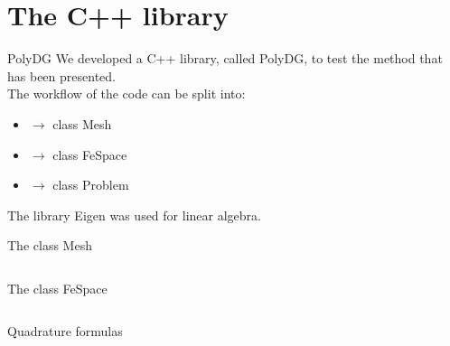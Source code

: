 \documentclass{beamer}
\newcommand{\code}[1]{{\footnotesize\ttfamily #1}}
\begin{document}
\section{The C++ library}
\begin{frame}{PolyDG}
We developed a C++ library, called PolyDG, to test the method that has been 
presented.\\
\vspace{0.5cm}
The workflow of the code can be split into:
\begin{itemize}
	\item {} $ \rightarrow $ class \code{Mesh}
	\item {} $ \rightarrow $ class \code{FeSpace}
	\item {} $ \rightarrow $ class \code{Problem}
\end{itemize}
\vspace{0.5cm}
 The library Eigen was used for linear algebra.
\end{frame}
\begin{frame}{The class Mesh}
\begin{columns}
\begin{column}{0.55\textwidth}

\end{column}
\begin{column}{0.55\textwidth}

\end{column}
\end{columns}
\end{frame}
\begin{frame}{The class FeSpace}
\begin{columns}
	\begin{column}{0.57\textwidth}
		
	\end{column}
	\begin{column}{0.57\textwidth}
		
	\end{column}
\end{columns}
\end{frame}
\begin{frame}{Quadrature formulas}
\begin{columns}
	\begin{column}{0.57\textwidth}
		
	\end{column}
	\begin{column}{0.57\textwidth}
		
	\end{column}
\end{columns}
	
\end{frame}
\end{document}
